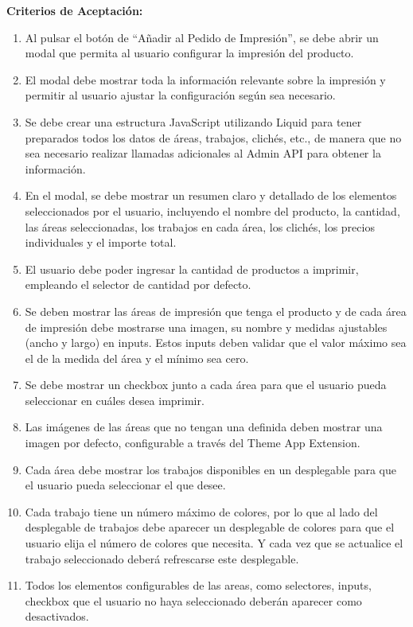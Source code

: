 \documentclass[11pt]{article}
\begin{document}
\vspace{0.5cm}
\textbf{Criterios de Aceptación:}
\begin{enumerate}[label=\arabic*.]
    \item Al pulsar el botón de ``Añadir al Pedido de Impresión'', se debe abrir un modal que permita al usuario configurar la impresión del producto.
    \item El modal debe mostrar toda la información relevante sobre la impresión y permitir al usuario ajustar la configuración según sea necesario.
    \item Se debe crear una estructura JavaScript utilizando Liquid para tener preparados todos los datos de áreas, trabajos, clichés, etc., de manera que no sea necesario realizar llamadas adicionales al Admin API para obtener la información.
    \item En el modal, se debe mostrar un resumen claro y detallado de los elementos seleccionados por el usuario, incluyendo el nombre del producto, la cantidad, las áreas seleccionadas, los trabajos en cada área, los clichés, los precios individuales y el importe total.
    \item El usuario debe poder ingresar la cantidad de productos a imprimir, empleando el selector de cantidad por defecto.
    \item Se deben mostrar las áreas de impresión que tenga el producto y de cada área de impresión debe mostrarse una imagen, su nombre y medidas ajustables (ancho y largo) en inputs. Estos inputs deben validar que el valor máximo sea el de la medida del área y el mínimo sea cero.
    \item Se debe mostrar un checkbox junto a cada área para que el usuario pueda seleccionar en cuáles desea imprimir.
    \item Las imágenes de las áreas que no tengan una definida deben mostrar una imagen por defecto, configurable a través del Theme App Extension.
    \item Cada área debe mostrar los trabajos disponibles en un desplegable para que el usuario pueda seleccionar el que desee.
    \item Cada trabajo tiene un número máximo de colores, por lo que al lado del desplegable de trabajos debe aparecer un desplegable de colores para que el usuario elija el número de colores que necesita. Y cada vez que se actualice el trabajo seleccionado deberá refrescarse este desplegable.
    \item Todos los elementos configurables de las areas, como selectores, inputs, checkbox que el usuario no haya seleccionado deberán aparecer como desactivados.

\end{enumerate}
\end{document}
